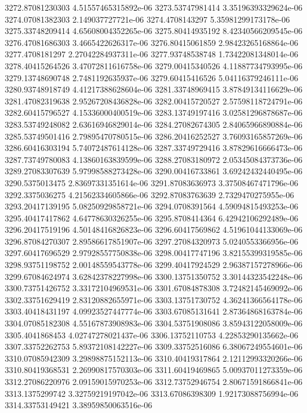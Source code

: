 {3272.87081230303 4.51557465315892e-06
3273.53747981414 3.35196393329624e-06
3274.07081382303 2.149037727721e-06
3274.4708143297 5.35981299173178e-06
3275.33748209414 4.65608004352265e-06
3275.80414935192 8.42340566209545e-06
3276.47081686303 3.4665422626317e-06
3276.80415061859 2.98423265168864e-06
3277.4708181297 2.27042284937311e-06
3277.93748538748 1.73422081348014e-06
3278.40415264526 3.47072811616758e-06
3279.00415340526 4.11887734793995e-06
3279.13748690748 2.7481192635937e-06
3279.60415416526 5.04116379246111e-06
3280.93748918749 4.41217388628604e-06
3281.33748969415 3.87849134116629e-06
3281.47082319638 2.95267208436828e-06
3282.00415720527 2.57598118724791e-06
3282.60415796527 4.15336000400519e-06
3283.13749197416 3.02581296878687e-06
3283.53749248082 2.63616946829014e-06
3284.27082674305 2.84065966890884e-06
3285.53749501416 2.79895470780515e-06
3286.20416252527 3.76093165857269e-06
3286.60416303194 5.74072487614128e-06
3287.33749729416 3.87829616666473e-06
3287.73749780083 4.13860163839599e-06
3288.27083180972 2.05345084373736e-06
3289.27083307639 5.97998588273428e-06
3290.00416733861 3.69242432440495e-06
3290.5375013475 2.83697331351614e-06
3291.87083636973 3.37508467471796e-06
3292.3375036275 4.21562334605866e-06
3292.87083763639 2.7329470275955e-06
3293.20417139195 5.08250929858721e-06
3294.0708391564 4.59094815493253e-06
3295.40417417862 4.64778630326255e-06
3295.8708414364 6.42942106292489e-06
3296.20417519196 4.50148416826823e-06
3296.60417569862 4.51961044133069e-06
3296.87084270307 2.89586617851907e-06
3297.27084320973 5.0240553366956e-06
3297.60417696529 2.97928557750838e-06
3298.00417747196 3.82155399319585e-06
3298.93751198752 2.00148559543778e-06
3299.40417924529 2.96387157278966e-06
3299.67084624974 3.62842378227998e-06
3300.13751350752 3.30144323542248e-06
3300.73751426752 3.33172104969531e-06
3301.67084878308 3.72482145469092e-06
3302.33751629419 2.83120882655971e-06
3303.13751730752 4.36241366564178e-06
3303.40418431197 4.09923527447774e-06
3303.67085131641 2.87364868163784e-06
3304.07085182308 4.55167873908983e-06
3304.53751908086 3.85943122058009e-06
3305.4041868453 4.02747278021437e-06
3306.13752110753 4.22853290135662e-06
3307.33752262753 5.89372108142227e-06
3309.33752516086 6.38067249554601e-06
3310.07085942309 3.29898875152113e-06
3310.40419317864 2.12112993320266e-06
3310.80419368531 2.26990817570303e-06
3311.60419469865 5.00937011273359e-06
3312.27086220976 2.09159015970253e-06
3312.73752946754 2.80671591866841e-06
3313.1375299742 3.32759219197042e-06
3313.67086398309 1.92173088756994e-06
3314.33753149421 3.38959850063516e-06
}
